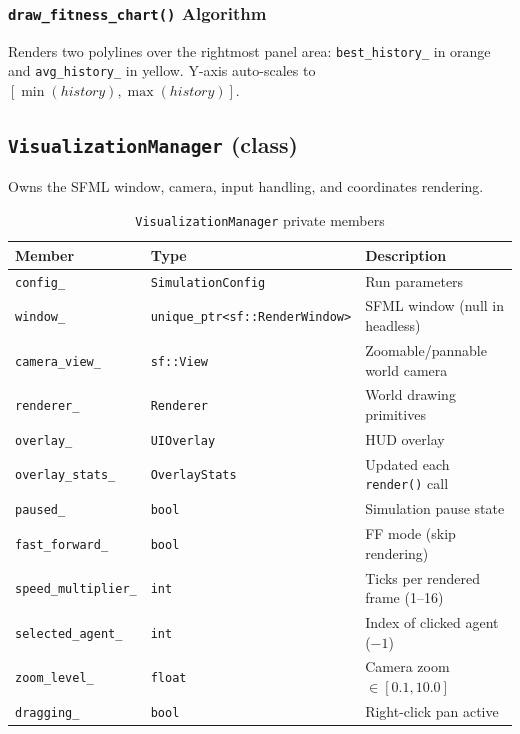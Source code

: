 \subsubsection{\texttt{draw\_fitness\_chart()} Algorithm}

Renders two polylines over the rightmost panel area: \texttt{best\_history\_} in orange
and \texttt{avg\_history\_} in yellow.  Y-axis auto-scales to
$[\min(\mathit{history}), \max(\mathit{history})]$.

\subsection{\texttt{VisualizationManager} (class)}

Owns the SFML window, camera, input handling, and coordinates rendering.

\begin{table}[H]
\centering\small
\caption{\texttt{VisualizationManager} private members}
\begin{tabularx}{\textwidth}{@{}llX@{}}
\toprule
\textbf{Member} & \textbf{Type} & \textbf{Description} \\
\midrule
\texttt{config\_}           & \texttt{SimulationConfig}                    & Run parameters \\
\texttt{window\_}           & \texttt{unique\_ptr<sf::RenderWindow>}        & SFML window (null in headless) \\
\texttt{camera\_view\_}     & \texttt{sf::View}                            & Zoomable/pannable world camera \\
\texttt{renderer\_}         & \texttt{Renderer}                            & World drawing primitives \\
\texttt{overlay\_}          & \texttt{UIOverlay}                           & HUD overlay \\
\texttt{overlay\_stats\_}   & \texttt{OverlayStats}                        & Updated each \texttt{render()} call \\
\texttt{paused\_}           & \texttt{bool}                                & Simulation pause state \\
\texttt{fast\_forward\_}    & \texttt{bool}                                & FF mode (skip rendering) \\
\texttt{speed\_multiplier\_}& \texttt{int}                                 & Ticks per rendered frame (1–16) \\
\texttt{selected\_agent\_}  & \texttt{int}                                 & Index of clicked agent ($-1$) \\
\texttt{zoom\_level\_}      & \texttt{float}                               & Camera zoom $\in [0.1, 10.0]$ \\
\texttt{dragging\_}         & \texttt{bool}                                & Right-click pan active \\
\bottomrule
\end{tabularx}
\end{table}

